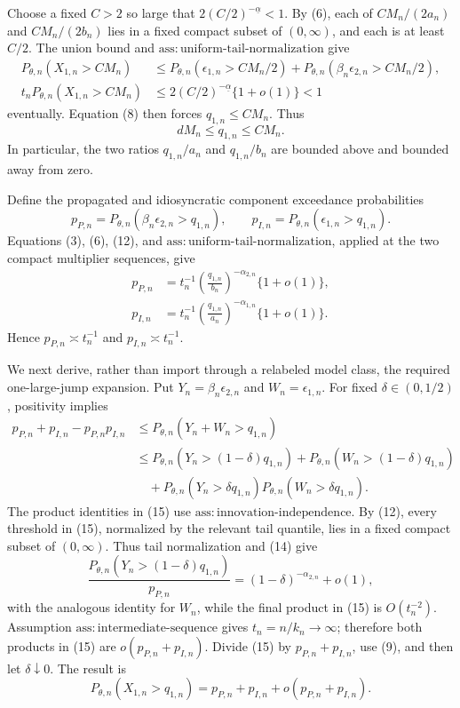 Choose a fixed \(C>2\) so large that
\(2(C/2)^{-\underline\alpha}<1\). By (6), each of
\(CM_n/(2a_n)\) and \(CM_n/(2b_n)\) lies in a fixed compact subset of
\((0,\infty)\), and each is at least \(C/2\). The union bound and
\(\mathrm{ass{:}uniform\text{-}tail\text{-}normalization}\) give
\[
\begin{aligned}
P_{\theta,n}(X_{1,n}>CM_n)
&\leq P_{\theta,n}(\epsilon_{1,n}>CM_n/2)
+P_{\theta,n}(\beta_n\epsilon_{2,n}>CM_n/2),\\
t_nP_{\theta,n}(X_{1,n}>CM_n)
&\leq2(C/2)^{-\underline\alpha}\{1+o(1)\}<1
\end{aligned}
\tag{11}
\]
eventually. Equation (8) then forces \(q_{1,n}\leq CM_n\). Thus
\[
dM_n\leq q_{1,n}\leq CM_n.
\tag{12}
\]
In particular, the two ratios \(q_{1,n}/a_n\) and \(q_{1,n}/b_n\) are
bounded above and bounded away from zero.

Define the propagated and idiosyncratic component exceedance probabilities
\[
p_{P,n}=P_{\theta,n}(\beta_n\epsilon_{2,n}>q_{1,n}),
\qquad
p_{I,n}=P_{\theta,n}(\epsilon_{1,n}>q_{1,n}).
\tag{13}
\]
Equations (3), (6), (12), and
\(\mathrm{ass{:}uniform\text{-}tail\text{-}normalization}\), applied at the
two compact multiplier sequences, give
\[
\begin{aligned}
p_{P,n}
&=t_n^{-1}\left(\frac{q_{1,n}}{b_n}\right)^{-\alpha_{2,n}}
\{1+o(1)\},\\
p_{I,n}
&=t_n^{-1}\left(\frac{q_{1,n}}{a_n}\right)^{-\alpha_{1,n}}
\{1+o(1)\}.
\end{aligned}
\tag{14}
\]
Hence \(p_{P,n}\asymp t_n^{-1}\) and \(p_{I,n}\asymp t_n^{-1}\).

We next derive, rather than import through a relabeled model class, the required
one-large-jump expansion. Put \(Y_n=\beta_n\epsilon_{2,n}\) and
\(W_n=\epsilon_{1,n}\). For fixed \(\delta\in(0,1/2)\), positivity implies
\[
\begin{aligned}
p_{P,n}+p_{I,n}-p_{P,n}p_{I,n}
&\leq P_{\theta,n}(Y_n+W_n>q_{1,n})\\
&\leq P_{\theta,n}(Y_n>(1-\delta)q_{1,n})
+P_{\theta,n}(W_n>(1-\delta)q_{1,n})\\
&\quad+P_{\theta,n}(Y_n>\delta q_{1,n})
P_{\theta,n}(W_n>\delta q_{1,n}).
\end{aligned}
\tag{15}
\]
The product identities in (15) use
\(\mathrm{ass{:}innovation\text{-}independence}\). By (12), every threshold
in (15), normalized by the relevant tail quantile, lies in a fixed compact
subset of \((0,\infty)\). Thus tail normalization and (14) give
\[
\frac{P_{\theta,n}(Y_n>(1-\delta)q_{1,n})}{p_{P,n}}
=(1-\delta)^{-\alpha_{2,n}}+o(1),
\tag{16}
\]
with the analogous identity for \(W_n\), while the final product in (15) is
\(O(t_n^{-2})\). Assumption \(\mathrm{ass{:}intermediate\text{-}sequence}\)
gives \(t_n=n/k_n\to\infty\); therefore both products in (15) are
\(o(p_{P,n}+p_{I,n})\). Divide (15) by \(p_{P,n}+p_{I,n}\), use (9), and
then let \(\delta\downarrow0\). The result is
\[
P_{\theta,n}(X_{1,n}>q_{1,n})
=p_{P,n}+p_{I,n}+o(p_{P,n}+p_{I,n}).
\tag{17}
\]

